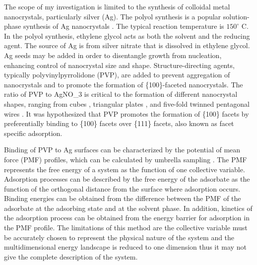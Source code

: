 
The scope of my investigation is limited to the synthesis of colloidal metal nanocrystals, particularly silver (Ag).
The polyol synthesis is a popular solution-phase synthesis of Ag nanocrystals \cite{Skrabalak_2007}.
The typical reaction temperature is $150^{\circ}$ C.
In the polyol synthesis, ethylene glycol acts as both the solvent and the reducing agent.
The source of Ag is from silver nitrate that is dissolved in ethylene glycol.
Ag seeds may be added in order to disentangle growth from nucleation, enhancing control of nanocrystal size and shape.
Structure-directing agents, typically polyvinylpyrrolidone (PVP), are added to prevent aggregation of nanocrystals and to promote the formation of \{100\}-faceted nanocrystals.
The ratio of PVP to AgNO_3 is critical to the formation of different nanocrystal shapes, ranging from cubes \cite{Xia_2012,Zhang_2010}, triangular plates \cite{Lofton_2005,Liu_2012}, and five-fold twinned pentagonal wires \cite{Zhu_2011,Zhang_2008,Sun_2002}.
It was hypothesized that PVP promotes the formation of \{100\} facets by preferentially binding to \{100\} facets over \{111\} facets\cite{Xia_2012,Sun_2002}, also known as facet specific adsorption.

Binding of PVP to Ag surfaces can be characterized by the potential of mean force (PMF) profiles, which can be calculated by umbrella sampling \cite{Torrie_1977,K_stner_2011}.
The PMF represents the free energy of a system as the function of one collective variable.
Adsorption processes can be described by the free energy of the adsorbate as the function of the orthogonal distance from the surface where adsorption occurs.
Binding energies can be obtained from the difference between the PMF of the adsorbate at the adsorbing state and at the solvent phase.
In addition, kinetics of the adsorption process can be obtained from the energy barrier for adsorption in the PMF profile.
The limitations of this method are the collective variable must be accurately chosen to represent the physical nature of the system and the multidimensional energy landscape is reduced to one dimension thus it may not give the complete description of the system.
  
  
  
  